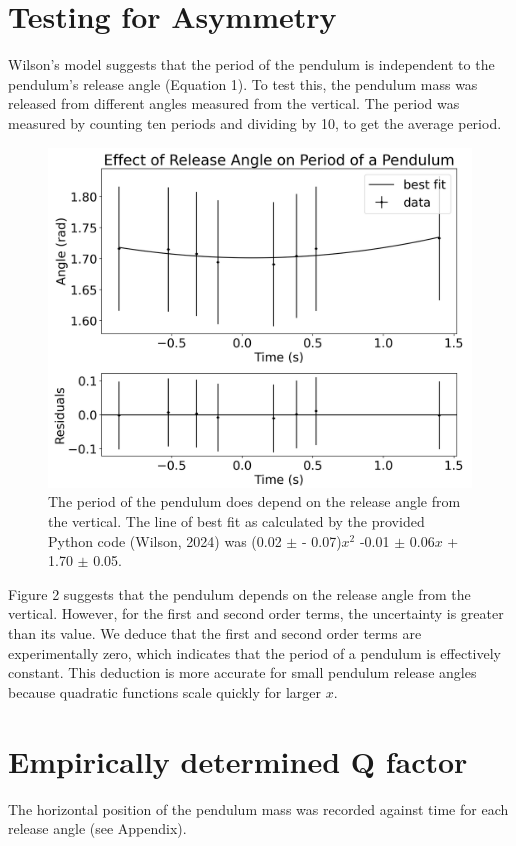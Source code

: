 \documentclass[notitlepage,twocolumn, 12pt]{report}
\begin{document}
    \section{Testing for Asymmetry}
    Wilson's model suggests that the period of the pendulum is independent to the pendulum's release angle (Equation 1). To test this, the pendulum mass was released from different angles measured from the vertical. The period was measured by counting ten periods and dividing by 10, to get the average period. 

    \begin{figure}[H]
        \includegraphics[width=\linewidth]{figure1.png}
        \caption{The period of the pendulum does depend on the release angle from the vertical. The line of best fit as calculated by the provided Python code (Wilson, 2024) was (0.02 $\pm$ - 0.07)$x^2$ -0.01 $\pm$ 0.06$x$ + 1.70 $\pm$ 0.05.}
    \end{figure}

    Figure 2 suggests that the pendulum depends on the release angle from the vertical. However, for the first and second order terms, the uncertainty is greater than its value. We deduce that the first and second order terms are experimentally zero, which indicates that the period of a pendulum is effectively constant. This deduction is more accurate for small pendulum release angles because quadratic functions scale quickly for larger $x$. 

    \section{Empirically determined Q factor}
    The horizontal position of the pendulum mass was recorded against time for each release angle (see Appendix).
\end{document}

